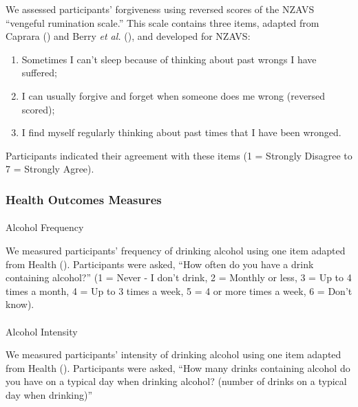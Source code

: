 \documentclass[
  single column]{article}
\makeatletter
\let\oldparagraph\paragraph
\renewcommand{\paragraph}{
    \@ifstar
      \xxxParagraphStar
      \xxxParagraphNoStar
  }
\newcommand{\xxxParagraphStar}[1]{\oldparagraph*{#1}\mbox{}}
\newcommand{\xxxParagraphNoStar}[1]{\oldparagraph{#1}\mbox{}}
\providecommand{\tightlist}{%
  \setlength{\itemsep}{0pt}\setlength{\parskip}{0pt}}\usepackage{longtable,booktabs,array}
\makeatother
\begin{document}
We assessed participants' forgiveness using reversed scores of the NZAVS
``vengeful rumination scale.'' This scale contains three items, adapted
from Caprara () and Berry
\emph{et al.} (), and
developed for NZAVS:

\begin{enumerate}
\def\labelenumi{(\arabic{enumi})}
\tightlist
\item
  Sometimes I can't sleep because of thinking about past wrongs I have
  suffered;
\item
  I can usually forgive and forget when someone does me wrong (reversed
  scored);
\item
  I find myself regularly thinking about past times that I have been
  wronged.
\end{enumerate}

Participants indicated their agreement with these items (1 = Strongly
Disagree to 7 = Strongly Agree).

\subsubsection{Health Outcomes Measures}\label{health-outcomes-measures}

\paragraph{Alcohol Frequency}\label{alcohol-frequency}

We measured participants' frequency of drinking alcohol using one item
adapted from Health ().
Participants were asked, ``How often do you have a drink containing
alcohol?'' (1 = Never - I don't drink, 2 = Monthly or less, 3 = Up to 4
times a month, 4 = Up to 3 times a week, 5 = 4 or more times a week, 6 =
Don't know).

\paragraph{Alcohol Intensity}\label{alcohol-intensity}

We measured participants' intensity of drinking alcohol using one item
adapted from Health ().
Participants were asked, ``How many drinks containing alcohol do you
have on a typical day when drinking alcohol? (number of drinks on a
typical day when drinking)''
\end{document}
